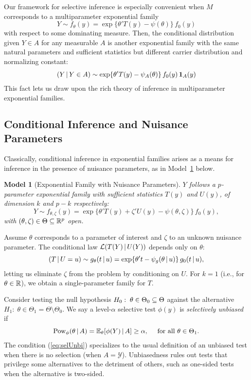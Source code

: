 \documentclass{article}
\newtheorem{model}[theorem]{Model}
\theoremstyle{definition}
\newcommand{\cY}{\mathcal{Y}}
\newcommand{\pow}{\text{Pow}}
\newcommand{\cL}{\mathcal{L}}
\begin{document}
Our framework for selective inference is especially convenient when $M$ corresponds to a multiparameter exponential family
\begin{equation}\label{eq:exfam}
  Y \sim f_{\theta}(y) = \exp\{\theta'T(y) - \psi(\theta)\}\, f_0(y)
\end{equation}
with respect to some dominating measure. Then, the conditional distribution given $Y\in A$ for any measurable $A$ is another exponential family with the same natural parameters and sufficient statistics but different carrier distribution and normalizing constant:
\begin{equation}
  (Y\,|\, Y\in A) \sim \exp\{\theta'T(y) -  \psi_A(\theta)\}\,
  f_0(y)\, \mathbf{1}_A(y)
\end{equation}
This fact lets us draw upon the rich theory of inference in
multiparameter exponential families.

\subsection{Conditional Inference and Nuisance Parameters}\label{sec:condInf}
Classically, conditional inference in exponential families arises as a means for inference in the presence of nuisance parameters, as in Model~\ref{mod:partExFam} below.

\begin{model}[Exponential Family with Nuisance Parameters]\label{mod:partExFam}
$Y$ follows a $p$-parameter exponential family with sufficient statistics $T(y)$ and $U(y)$, of dimension $k$ and $p-k$ respectively:
\begin{equation}\label{eq:partExFam}
  Y\sim f_{\theta,\zeta}(y)
  = \exp\{\theta'T(y) + \zeta 'U(y) - \psi(\theta, \zeta)\}\, f_{0}(y),
\end{equation}
with $(\theta,\zeta)\in \Theta\subseteq \mathbb{R}^{p}$ open.
\end{model}

Assume $\theta$ corresponds to a parameter of interest and $\zeta$ to an unknown nuisance parameter.
The conditional law $\cL(T(Y) \gv U(Y))$ depends only on $\theta$:
\begin{equation}\label{eq:efCond}
  \left(T\,|\, U=u\right) \sim g_{\theta}(t \,|\, u) = \exp\{\theta't -
    \psi_g(\theta\,|\, u)\}\, g_0(t\,|\, u),
\end{equation}
letting us eliminate $\zeta$ from the problem by conditioning on $U$. For $k=1$ (i.e., for $\theta\in \mathbb{R}$), we obtain a single-parameter family for $T$.

Consider testing the null hypothesis $H_0:\; \theta \in \Theta_0 \subseteq \Theta$ against the alternative $H_1:\; \theta \in \Theta_1 = \Theta\setminus \Theta_0$. We say a level-$\alpha$ selective test $\phi(y)$ is {\em selectively unbiased} if
\begin{equation}\label{eq:selUnbi}
  \pow_\phi(\theta \gv A) = \E_{\theta}[\phi(Y) \gv A] \geq \alpha, \quad \text{ for all }\theta\in \Theta_1.
\end{equation}
The condition (\ref{eq:selUnbi}) specializes to the usual definition of an unbiased test when there is no selection (when $A=\cY$). Unbiasedness rules out tests that privilege some alternatives to the detriment of others, such as one-sided tests when the alternative is two-sided.
\end{document}
